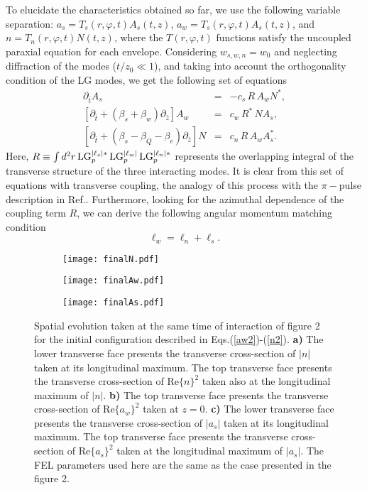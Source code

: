 \documentclass[aps,pra,preprint,showpacs,preprintnumbers,amsmath,amssymb]{revtex4-1}
\begin{document}
To elucidate the characteristics obtained so far, we use the following variable separation: $a_s = T_s(r,\varphi,t) A_s(t,z)$, $a_w = T_s(r,\varphi,t) A_s(t,z)$, and $n = T_n (r,\varphi,t) N(t,z)$, where the $T(r,\varphi,t)$ functions satisfy the uncoupled paraxial equation for each envelope. Considering $w_{s,w,n} = w_0$ and neglecting diffraction of the modes ($t/z_0 \ll 1$), and taking into account the orthogonality condition of the LG modes, we get the following set of equations
\begin{eqnarray}
\partial_{\bar{t}} A_s &=& - c_s\, R\, A_w N^*, \nonumber \\
\left[\partial_{\bar{t}}  + (\beta_s + \beta_w)\partial_{\bar{z}}  \right] A_w &=& c_w\, R^*\, N A_s ,\nonumber \\
\left[\partial_{\bar{t}}  + (\beta_s - \beta_Q - \beta_e)\partial_{\bar{z}}  \right] N &=& c_n\, R \,A_w A_s^*.  \nonumber
\end{eqnarray}
Here, $R \equiv \int d^2 r\, \textnormal{LG}^{|\ell_s|*}_p\,\textnormal{LG}^{|\ell_w|}_p\, \textnormal{LG}^{|\ell_n|*}_p$    represents the overlapping integral of the transverse structure of the three interacting modes. It is clear from this set of equations with transverse coupling, the analogy of this process with the $\pi-$pulse description in Ref.\cite{guarumo}. Furthermore, looking for the azimuthal dependence of the coupling term $R$, we can derive the following angular momentum matching condition \cite{titoprl}
\begin{equation}
  \ell_w = \ell_n + \ell_s. \label{matching}
\end{equation}
\begin{figure}[h!]

\begin{subfigure}{0.3\textwidth}
   \texttt{[image: finalN.pdf]}
 \caption{}
\end{subfigure}
\begin{subfigure}{0.3\textwidth}
  \centering
  \texttt{[image: finalAw.pdf]}
 \caption{}
\end{subfigure}
\begin{subfigure}{0.27\textwidth}
  \centering
  \texttt{[image: finalAs.pdf]}
 \caption{}
\end{subfigure}
\caption{Spatial evolution taken at the same time of interaction of figure 2 for the initial configuration described in Eqs.(\ref{aw2})-(\ref{n2}). \textbf{a)} The lower transverse face presents the transverse cross-section of $|n|$ taken at its longitudinal maximum. The top transverse face presents the transverse cross-section of Re$\{n\}^2$ taken also at the longitudinal maximum of $|n|$. \textbf{ b)} The top transverse face presents the transverse cross-section of Re$\{a_w\}^2$ taken at $z=0$. \textbf{c)} The lower transverse face presents the transverse cross-section of $|a_s|$ taken at its longitudinal maximum. The top transverse face presents the transverse cross-section of Re$\{a_s\}^2$ taken at the longitudinal maximum of $|a_s|$. The FEL parameters used here are the same as the case presented in the figure 2.}
\label{fig:nlinear}
\end{figure}
\end{document}

